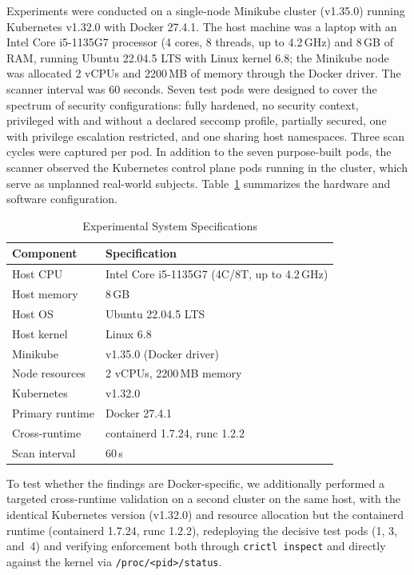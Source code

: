 \documentclass[conference]{IEEEtran}
\begin{document}
Experiments were conducted on a single-node Minikube cluster (v1.35.0) running Kubernetes v1.32.0 with Docker 27.4.1. The host machine was a laptop with an Intel Core i5-1135G7 processor (4 cores, 8 threads, up to 4.2\,GHz) and 8\,GB of RAM, running Ubuntu 22.04.5 LTS with Linux kernel 6.8; the Minikube node was allocated 2 vCPUs and 2200\,MB of memory through the Docker driver. The scanner interval was 60 seconds. Seven test pods were designed to cover the spectrum of security configurations: fully hardened, no security context, privileged with and without a declared seccomp profile, partially secured, one with privilege escalation restricted, and one sharing host namespaces. Three scan cycles were captured per pod. In addition to the seven purpose-built pods, the scanner observed the Kubernetes control plane pods running in the cluster, which serve as unplanned real-world subjects. Table~\ref{tab:specs} summarizes the hardware and software configuration.

\begin{table}[htbp]
\caption{Experimental System Specifications}
\label{tab:specs}
\centering
\begin{tabular}{ll}
\toprule
\textbf{Component} & \textbf{Specification} \\
\midrule
Host CPU        & Intel Core i5-1135G7 (4C/8T, up to 4.2\,GHz) \\
Host memory     & 8\,GB \\
Host OS         & Ubuntu 22.04.5 LTS \\
Host kernel     & Linux 6.8 \\
Minikube        & v1.35.0 (Docker driver) \\
Node resources  & 2 vCPUs, 2200\,MB memory \\
Kubernetes      & v1.32.0 \\
Primary runtime & Docker 27.4.1 \\
Cross-runtime   & containerd 1.7.24, runc 1.2.2 \\
Scan interval   & 60\,s \\
\bottomrule
\end{tabular}
\end{table}

To test whether the findings are Docker-specific, we additionally performed a targeted cross-runtime validation on a second cluster on the same host, with the identical Kubernetes version (v1.32.0) and resource allocation but the containerd runtime (containerd 1.7.24, runc 1.2.2), redeploying the decisive test pods (1, 3, and~4) and verifying enforcement both through \texttt{crictl inspect} and directly against the kernel via \texttt{/proc/<pid>/status}.
\end{document}
